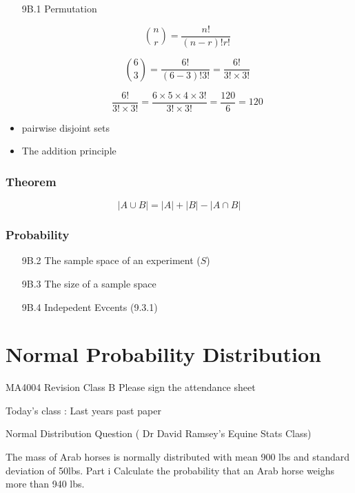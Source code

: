 \documentclass[12pt]{report}
\begin{document}
\begin{itemize}
	\item[9B.1] Permutation
	
	\[ {n \choose r} = \frac{n!}{(n-r)! r!} \]
	
	
	\[ {6 \choose 3} = \frac{6!}{(6-3)! 3!} = \frac{6!}{3! \times 3!}\]
	
	
	\[ \frac{6!}{3! \times 3!} = \frac{6 \times 5 \times 4 \times 3!}{3! \times 3!} = \frac{120}{6} = 120\]
\end{itemize}



\begin{itemize}
	\item pairwise disjoint sets
	\item The addition principle
\end{itemize}
\subsection*{Theorem}
\[ |A \cup B| = |A| + |B| - |A \cap B|  \]

\subsection*{Probability}
\begin{itemize}
	\item[9B.2] The sample space of an experiment ($S$)
	\item[9B.3] The size of a sample space
	\item[9B.4] Indepedent Evcents (9.3.1)
\end{itemize}

\chapter{Normal Probability Distribution}
MA4004 Revision Class B
Please sign the attendance sheet

Today's class : Last years past paper 


Normal Distribution Question ( Dr David Ramsey's Equine Stats Class)

The mass of Arab horses is normally distributed with mean 900 lbs and standard deviation of 50lbs.
Part i Calculate the probability that an Arab horse weighs more than 940 lbs.
\end{document}
